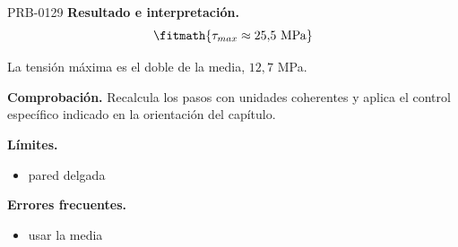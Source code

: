 \begin{studiumworked}{PRB-0129}
\textbf{Resultado e interpretación.}\[\fitmath{\tau_{max} \approx 25{,}5\ \mathrm{MPa}}\]

La tensión máxima es el doble de la media, $12{,}7$ MPa.

\par\textbf{Comprobación.} Recalcula los pasos con unidades coherentes y aplica el control específico indicado en la orientación del capítulo.

\textbf{Límites.}\begin{itemize}\item pared delgada\end{itemize}

\textbf{Errores frecuentes.}\begin{itemize}\item usar la media\end{itemize}

\end{studiumworked}

\Needspace{.3\textheight}

